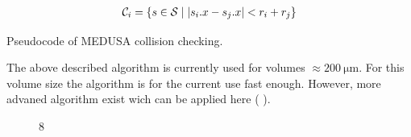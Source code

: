 \begin{align}
\begin{split}
\mathcal{C}_i = \{ s \in \mathcal{S} \mid \lvert s_i.x - s_j.x\rvert < r_i+r_j \}
\end{split}
\end{align}
% 
\begin{lstfloat}[!t]
	
	\caption{Pseudocode of \acs{MEDUSA} collision checking.}
	\label{alg:medusa_collision}
\end{lstfloat}
% 
The above described algorithm is currently used for volumes $\approx \SI{200}{\micro\meter}$. For this volume size the algorithm is for the current use fast enough. However, more advaned algorithm exist wich can be applied here (\eg{}  \cite{Karras2012}).
% 
\begin{figure}[!t]
    \centering
	\caption{8 \cite{Ginsburger2019}}
	\label{fig:medusa_8}
\end{figure}
% 
